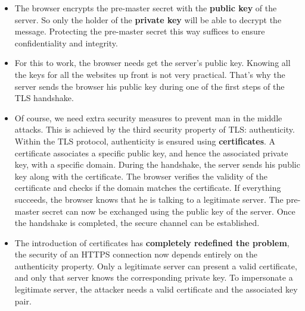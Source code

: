 \documentclass[../main.tex]{subfiles}
\begin{document}
\begin{itemize}
\begin{itemize}
\item The browser encrypts the pre-master secret with the \textbf{public key} of the server. So only the holder of the \textbf{private key} will be able to decrypt the message. Protecting the pre-master secret this way suffices to ensure confidentiality and integrity.
\item For this to work, the browser needs get the server’s public key. Knowing all the keys for all the websites up front is not very practical. That’s why the server sends the browser his public key during one of the first steps of the TLS handshake.
\item Of course, we need extra security measures to prevent man in the middle attacks. This is achieved by the third security property of TLS: authenticity. Within the TLS protocol, authenticity is ensured using \textbf{certificates}. A certificate associates a specific public key, and hence the associated private key, with a specific domain. During the handshake, the server sends his public key along with the certificate. The browser verifies the validity of the certificate and checks if the domain matches the certificate. If everything succeeds, the browser knows that he is talking to a legitimate server. The pre-master secret can now be exchanged using the public key of the server. Once the handshake is completed, the secure channel can be established.
\item The introduction of certificates has \textbf{completely redefined the problem}, the security of an HTTPS connection now depends entirely on the authenticity property. Only a legitimate server can present a valid certificate, and only that server knows the
corresponding private key. To impersonate a legitimate server, the attacker needs a valid certificate and the associated key pair.
\end{itemize}
\end{itemize}
\end{document}
